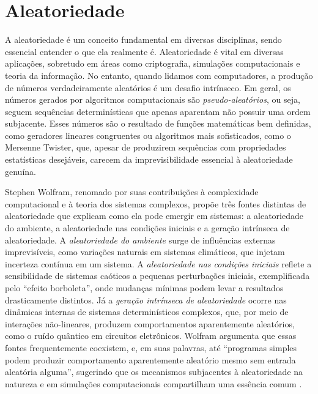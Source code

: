 \chapter{Aleatoriedade}

A aleatoriedade é um conceito fundamental em diversas disciplinas, sendo
essencial entender o que ela realmente é. Aleatoriedade é vital em diversas
aplicações, sobretudo em áreas como criptografia, simulações computacionais e
teoria da informação. No entanto, quando lidamos com computadores, a produção
de números verdadeiramente aleatórios é um desafio intrínseco. Em geral, os
números gerados por algoritmos computacionais são \emph{pseudo-aleatórios},
ou seja, seguem sequências determinísticas que apenas aparentam não possuir uma
ordem subjacente. Esses números são o resultado de funções matemáticas bem
definidas, como geradores lineares congruentes ou algoritmos mais sofisticados,
como o Mersenne Twister, que, apesar de produzirem sequências com propriedades
estatísticas desejáveis, carecem da imprevisibilidade essencial à aleatoriedade
genuína.

Stephen Wolfram, renomado por suas contribuições à complexidade computacional e
à teoria dos sistemas complexos, propõe três fontes distintas de aleatoriedade
que explicam como ela pode emergir em sistemas: a aleatoriedade do ambiente, a
aleatoriedade nas condições iniciais e a geração intrínseca de aleatoriedade. A
\emph{aleatoriedade do ambiente} surge de influências externas imprevisíveis,
como variações naturais em sistemas climáticos, que injetam incerteza contínua
em um sistema. A \emph{aleatoriedade nas condições iniciais} reflete a
sensibilidade de sistemas caóticos a pequenas perturbações iniciais,
exemplificada pelo ``efeito borboleta'', onde mudanças mínimas podem levar a
resultados drasticamente distintos. Já a \emph{geração intrínseca de
aleatoriedade} ocorre nas dinâmicas internas de sistemas determinísticos
complexos, que, por meio de interações não-lineares, produzem comportamentos
aparentemente aleatórios, como o ruído quântico em circuitos eletrônicos.
Wolfram argumenta que essas fontes frequentemente coexistem, e, em suas
palavras, até ``programas simples podem produzir comportamento aparentemente
aleatório mesmo sem entrada aleatória alguma'', sugerindo que os mecanismos
subjacentes à aleatoriedade na natureza e em simulações computacionais
compartilham uma essência comum \parencite{wolfram2002}.

